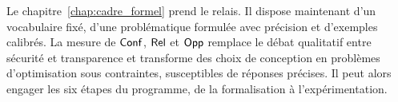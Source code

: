\begin{sloppypar}
Le chapitre~\ref{chap:cadre_formel} prend le relais. Il dispose maintenant
d'un vocabulaire fix\'e, d'une probl\'ematique formul\'ee avec pr\'ecision
et d'exemples calibr\'es. La mesure de $\mathsf{Conf}$, $\mathsf{Rel}$ et $\mathsf{Opp}$ remplace le d\'ebat qualitatif entre s\'ecurit\'e et transparence et transforme des choix de conception en
probl\`emes d'optimisation sous contraintes, susceptibles de r\'eponses
pr\'ecises. Il peut alors engager les six \'etapes du programme,
de la formalisation \`a l'exp\'erimentation.
\end{sloppypar}

